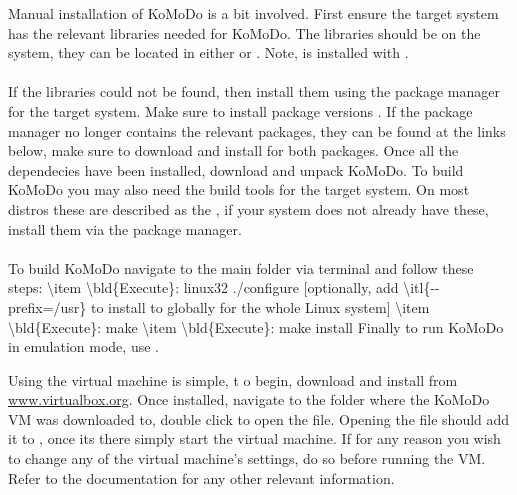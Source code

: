 Manual installation of KoMoDo is a bit involved. First ensure the target system has the relevant libraries needed for KoMoDo. The libraries
should be on the system, they can be located in either  or . Note,  is installed with .\\\\
%
If the libraries could not be found, then install them using the package manager for the target system. Make sure to install package versions . If the package manager no longer contains the relevant packages, they can be found at the links below, make sure to download and install  for both packages.
%
Once all the dependecies have been installed, download and unpack KoMoDo. To build KoMoDo you may also need the build tools for the target system. On most distros these are described as the , if your system does not already have these, install them via the package manager.\\\\
%
To build KoMoDo navigate to the main folder via terminal and follow these steps:
\num{
  \item \bld{Execute}: linux32 ./configure [optionally, add \itl{--prefix=/usr} to install to globally for the whole Linux system]
  \item \bld{Execute}: make
  \item \bld{Execute}: make install
}
%
Finally to run KoMoDo in emulation mode, use .

Using the virtual machine is simple, t o begin, download and install  from \textcolor{blue}{\url{www.virtualbox.org}}. Once installed, navigate to the folder where the KoMoDo VM was downloaded to, double click to open the  file. Opening the file should add it to , once its there simply start the virtual machine. If for any reason you wish to change any of the virtual machine's settings, do so before running the VM. Refer to the  documentation for any other relevant information.
